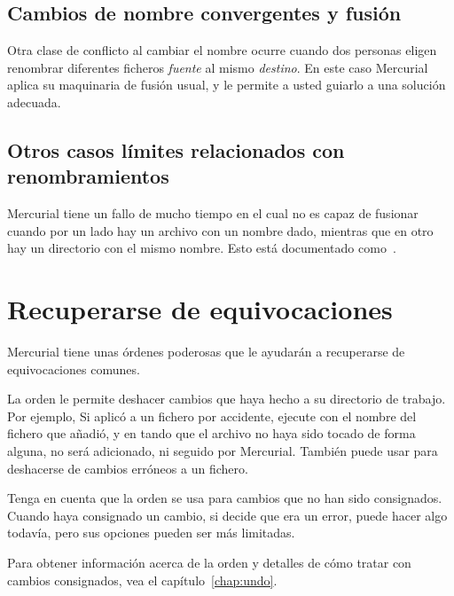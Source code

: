 \subsection{Cambios de nombre convergentes y fusión}

Otra clase de conflicto al cambiar el nombre ocurre cuando dos
personas eligen renombrar diferentes ficheros \emph{fuente} al mismo
\emph{destino}. En este caso Mercurial aplica su maquinaria de fusión
usual, y le permite a usted guiarlo a una solución adecuada.

\subsection{Otros casos límites relacionados con renombramientos}

Mercurial tiene un fallo de mucho tiempo en el cual no es capaz de
fusionar cuando por un lado hay un archivo con un nombre dado,
mientras que en otro hay un directorio con el mismo nombre. Esto está
documentado como~.

\section{Recuperarse de equivocaciones}

Mercurial tiene unas órdenes poderosas que le ayudarán a recuperarse
de equivocaciones comunes.

La orden  le permite deshacer cambios que haya hecho a
su directorio de trabajo. Por ejemplo, Si aplicó  a un
fichero por accidente, ejecute  con el nombre del
fichero que añadió, y en tando que el archivo no haya sido tocado de
forma alguna, no será adicionado, ni seguido por Mercurial.  También
puede usar  para deshacerse de cambios erróneos a un
fichero.

Tenga en cuenta que la orden  se usa para cambios que no
han sido consignados. Cuando haya consignado un cambio, si decide que
era un error, puede hacer algo todavía, pero sus opciones pueden ser
más limitadas.

Para obtener información acerca de la orden  y detalles
de cómo tratar con cambios consignados, vea el capítulo~\ref{chap:undo}.

